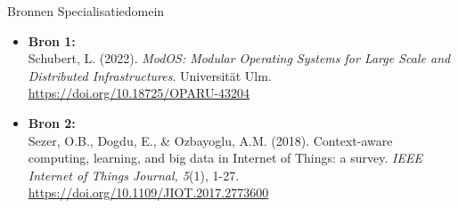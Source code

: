 \documentclass[aspectratio=169]{beamer}
\begin{document}
\begin{frame}{Bronnen Specialisatiedomein}
    
    \vspace{-5pt}
    
    \begin{tcolorbox}[colback=colortwo, colframe=colorsix, width=.8\textwidth]
        \begin{itemize}[label=\textcolor{colorsix}{$\blacktriangleright$}]
            \item \textbf{\textcolor{colorsix}{Bron 1:}} \\ Schubert, L. (2022). \textit{ModOS: Modular Operating Systems for Large Scale and Distributed Infrastructures}. Universität Ulm. \href{https://doi.org/10.18725/OPARU-43204}{\textcolor{linkblue}{https://doi.org/10.18725/OPARU-43204}}
            \item \textbf{\textcolor{colorsix}{Bron 2:}} \\ Sezer, O.B., Dogdu, E., \& Ozbayoglu, A.M. (2018). Context-aware computing, learning, and big data in Internet of Things: a survey. \textit{IEEE Internet of Things Journal, 5}(1), 1-27. \href{https://doi.org/10.1109/JIOT.2017.2773600}{\textcolor{linkblue}{https://doi.org/10.1109/JIOT.2017.2773600}}
        \end{itemize}
    \end{tcolorbox}
    
\end{frame}
\end{document}
